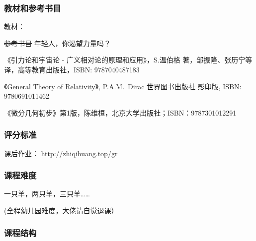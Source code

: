 \documentclass[CJK,13pt]{beamer}
\date{}
\begin{document}
  \bch
{}


\begin{frame}
\frametitle{教材和参考书目}

教材：

\skiplines

\sout{参考书目} 年轻人，你渴望力量吗？
\bitem
\item{《引力论和宇宙论 - 广义相对论的原理和应用》，S.温伯格 著，邹振隆、张历宁等 译，高等教育出版社，ISBN: 9787040487183}
\item{《General Theory of Relativity》, P.A.M.~Dirac 世界图书出版社 影印版, ISBN: 9780691011462}
\item{《微分几何初步》第1版，陈维桓，北京大学出版社；ISBN：9787301012291}
\eitem
      
\end{frame}




\begin{frame}
\frametitle{评分标准}


\skipline

课后作业： http://zhiqihuang.top/gr

\end{frame}




\begin{frame}
  \frametitle{课程难度}

      

  一只羊，两只羊，三只羊……


  \skiplines
  
  (全程幼儿园难度，大佬请自觉退课）
  
\end{frame}


\begin{frame}
  \frametitle{课程结构}
\end{frame}


\ech
\end{document}

